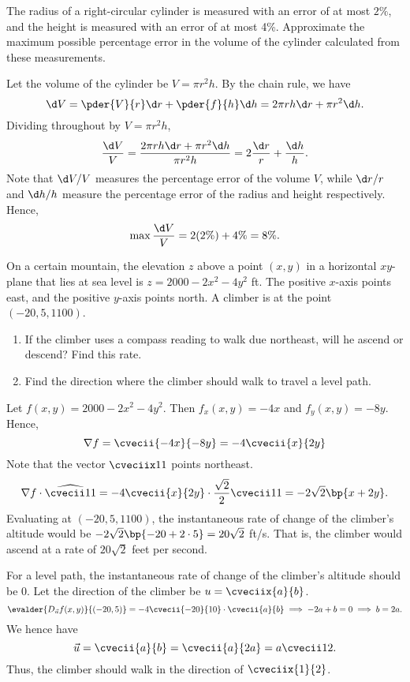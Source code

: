\begin{problem}
    The radius of a right-circular cylinder is measured with an error of at most $2\%$, and the height is measured with an error of at most 4\%. Approximate the maximum possible percentage error in the volume of the cylinder calculated from these measurements.
\end{problem}
\begin{solution}
    Let the volume of the cylinder be $V = \pi r^2 h$. By the chain rule, we have \[\d V = \pder{V}{r} \d r + \pder{f}{h} \d h = 2\pi rh \d  r + \pi r^2 \d h.\] Dividing throughout by $V = \pi r^2 h$, \[\frac{\d V}{V} = \frac{2\pi rh \d  r + \pi r^2 \d h}{\pi r^2 h} = 2 \frac{\d r}{r} + \frac{\d h}{h}.\] Note that $\d V / V$ measures the percentage error of the volume $V$, while $\d r / r$ and $\d h / h$ measure the percentage error of the radius and height respectively. Hence, \[\max \frac{\d V}{V} = 2(2\%) + 4\% = 8\%.\]
\end{solution}

\begin{problem}
    On a certain mountain, the elevation $z$ above a point $(x, y)$ in a horizontal $xy$-plane that lies at sea level is $z = 2000 - 2x^2 - 4y^2$ ft. The positive $x$-axis points east, and the positive $y$-axis points north. A climber is at the point $(-20, 5, 1100)$.

    \begin{enumerate}
        \item If the climber uses a compass reading to walk due northeast, will he ascend or descend? Find this rate.
        \item Find the direction where the climber should walk to travel a level path.
    \end{enumerate}
\end{problem}
\begin{solution}
    \begin{ppart}
        Let $f(x, y) = 2000 - 2x^2 - 4y^2$. Then $f_x(x, y) = -4x$ and $f_y(x, y) = -8y$. Hence, \[\nabla f = \cvecii{-4x}{-8y} = -4\cvecii{x}{2y}\] Note that the vector $\cveciix11$ points northeast. \[\nabla f \cdot \widehat{\cvecii11} = -4\cvecii{x}{2y} \cdot \frac{\sqrt2}{2} \cvecii11 = -2\sqrt2 \bp{x + 2y}.\] Evaluating at $(-20, 5, 1100)$, the instantaneous rate of change of the climber's altitude would be $-2\sqrt2\bp{-20 + 2\cdot5} = 20\sqrt2$ ft/s. That is, the climber would ascend at a rate of $20\sqrt2$ feet per second.
    \end{ppart}
    \begin{ppart}
        For a level path, the instantaneous rate of change of the climber's altitude should be 0. Let the direction of the climber be $u = \cveciix{a}{b}$. \[\evalder{D_{\vec u} f(x, y)}{(-20, 5)} = -4\cvecii{-20}{10} \cdot \cvecii{a}{b} \implies -2a + b = 0 \implies b = 2a.\] We hence have \[\vec u = \cvecii{a}{b} = \cvecii{a}{2a} = a\cvecii12.\] Thus, the climber should walk in the direction of $\cveciix{1}{2}$.
    \end{ppart}
\end{solution}

